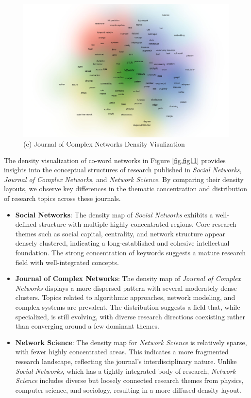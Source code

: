 \documentclass[twocolumn]{article}
\begin{document}
\begin{figure}
\begin{minipage}[b]{0.32\textwidth}
				\includegraphics[width=\linewidth]{Journal of Complex Networks/VOS/co-word.pdf}
				(c) Journal of Complex Networks Density Visulization
			\end{minipage}
		\end{figure}
		
		The density visualization of co-word networks in Figure \ref{fig.fig11} provides insights into the conceptual structures of research published in \textit{Social Networks}, \textit{Journal of Complex Networks}, and \textit{Network Science}. By comparing their density layouts, we observe key differences in the thematic concentration and distribution of research topics across these journals.
		
		\begin{itemize}
			\item \textbf{Social Networks}: The density map of \textit{Social Networks} exhibits a well-defined structure with multiple highly concentrated regions. Core research themes such as social capital, centrality, and network structure appear densely clustered, indicating a long-established and cohesive intellectual foundation. The strong concentration of keywords suggests a mature research field with well-integrated concepts.
			
			\item \textbf{Journal of Complex Networks}: The density map of \textit{Journal of Complex Networks} displays a more dispersed pattern with several moderately dense clusters. Topics related to algorithmic approaches, network modeling, and complex systems are prevalent. The distribution suggests a field that, while specialized, is still evolving, with diverse research directions coexisting rather than converging around a few dominant themes.
			
			\item \textbf{Network Science}: The density map for \textit{Network Science} is relatively sparse, with fewer highly concentrated areas. This indicates a more fragmented research landscape, reflecting the journal’s interdisciplinary nature. Unlike \textit{Social Networks}, which has a tightly integrated body of research, \textit{Network Science} includes diverse but loosely connected research themes from physics, computer science, and sociology, resulting in a more diffused density layout.
		\end{itemize}
		
\end{document}
